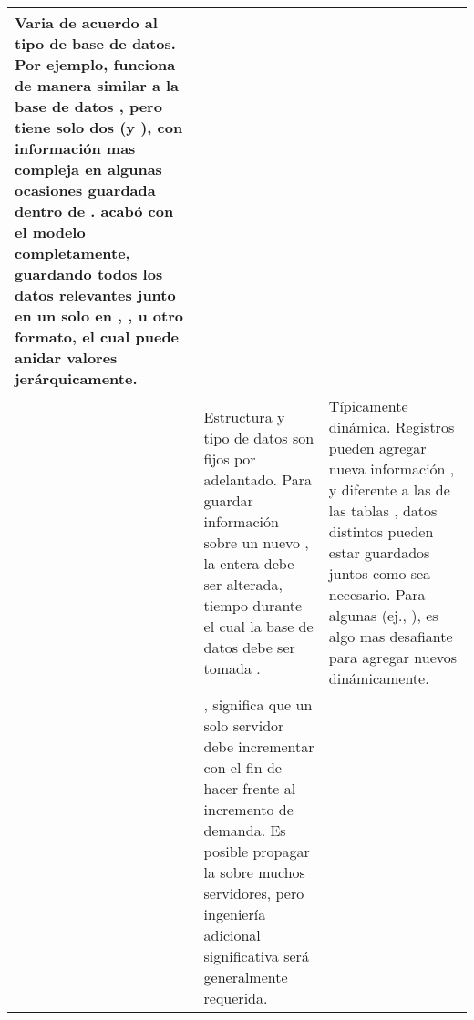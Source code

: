 \begin{table}[h!]
\begin{tabular}{ |L{0.1\paperwidth}|L{0.25\paperwidth}|L{0.25\paperwidth}|}
	Varia de acuerdo al tipo de base de datos. Por ejemplo, \keyValue \store funciona de manera similar a la base de datos \sqlNAME, pero tiene solo dos \columns (\keyDB y ), con información mas compleja en algunas ocasiones guardada dentro de \columns {}. \docDataBase acabó con el modelo \tableArow completamente, guardando todos los datos relevantes junto en un solo \documentDB en \jsonNAME, \xmlNAME, u otro formato, el cual puede anidar valores jerárquicamente.
	

\\ \hline
	\schemasDB&
	
	Estructura y tipo de datos son fijos por adelantado. Para guardar información sobre un nuevo \dataItem, la \dataBaseDB entera debe ser alterada, tiempo durante el cual la base de datos debe ser tomada \offline.&

	Típicamente dinámica. Registros pueden agregar nueva información \onTheFly, y diferente a las \rowsDB de las tablas \sqlNAME, datos distintos pueden estar guardados juntos como sea necesario. Para algunas \dataBasesDB (ej., \wideColumnDB \stores), es algo mas desafiante para agregar nuevos \fields dinámicamente.

\\ \hline
	\scaling&%
	
	\verticallyScale, significa que un solo servidor debe incrementar \powerful con el fin de hacer frente al incremento de demanda. Es posible propagar la \dataBaseDB \sqlNAME sobre muchos servidores, pero ingeniería adicional significativa será generalmente requerida.&
	

\end{tabular}
\end{table}
